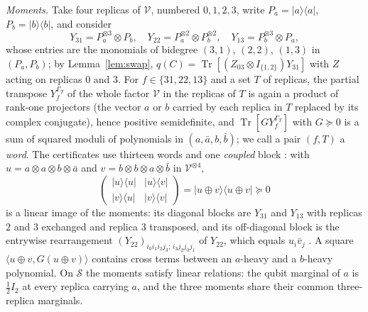 \documentclass[aps,pra,twocolumn,superscriptaddress,nofootinbib,longbibliography]{revtex4-2}
\newcommand{\V}{\mathcal V}
\newcommand{\ip}[2]{\langle #1,#2\rangle}
\newcommand{\ket}[1]{|#1\rangle}
\newcommand{\bra}[1]{\langle #1|}
\DeclareMathOperator{\Tr}{Tr}
\theoremstyle{plain}
\theoremstyle{definition}
\theoremstyle{remark}
\begin{document}
\emph{Moments.} Take four replicas of $\V$, numbered $0,1,2,3$, write $P_a=\ket a\bra a$, $P_b=\ket b\bra b$, and consider
\begin{equation}\label{eq:moments}
Y_{31}=P_a^{\otimes3}\otimes P_b,\quad Y_{22}=P_a^{\otimes2}\otimes P_b^{\otimes2},\quad Y_{13}=P_b^{\otimes3}\otimes P_a ,
\end{equation}
whose entries are the monomials of bidegree $(3,1)$, $(2,2)$, $(1,3)$ in $(P_a,P_b)$; by Lemma~\ref{lem:swap}, $q(C)=\Tr[(Z_{03}\otimes I_{\{1,2\}})Y_{31}]$ with $Z$ acting on replicas $0$ and $3$. For $f\in\{31,22,13\}$ and a set $T$ of replicas, the partial transpose $Y_f^{\Gamma_T}$ of the whole factor $\V$ in the replicas of $T$ is again a product of rank-one projectors (the vector $a$ or $b$ carried by each replica in $T$ replaced by its complex conjugate), hence positive semidefinite, and $\Tr[GY_f^{\Gamma_T}]$ with $G\succeq0$ is a sum of squared moduli of polynomials in $(a,\bar a,b,\bar b)$; we call a pair $(f,T)$ a \emph{word}. The certificates use thirteen words and one \emph{coupled} block \cite{Zenodo,Liu}: with $u=a\otimes a\otimes b\otimes\bar a$ and $v=b\otimes b\otimes a\otimes\bar b$ in $\V^{\otimes4}$,
\begin{equation}\label{eq:coupled}
\begin{pmatrix}\ket u\bra u&\ket u\bra v\\ \ket v\bra u&\ket v\bra v\end{pmatrix}=\ket{u\oplus v}\bra{u\oplus v}\succeq0
\end{equation}
is a linear image of the moments: its diagonal blocks are $Y_{31}$ and $Y_{13}$ with replicas $2$ and $3$ exchanged and replica $3$ transposed, and its off-diagonal block is the entrywise rearrangement $(Y_{22})_{i_0i_1i_2j_3;\,i_3j_2j_0j_1}$ of $Y_{22}$, which equals $u_i\bar v_j$ \cite[Sec.~3.2]{Zenodo}. A square $\ip{u\oplus v}{G(u\oplus v)}$ contains cross terms between an $a$-heavy and a $b$-heavy polynomial. On $\mathcal S$ the moments satisfy linear relations: the qubit marginal of $a$ is $\tfrac12I_2$ at every replica carrying $a$, and the three moments share their common three-replica marginals.
\end{document}
